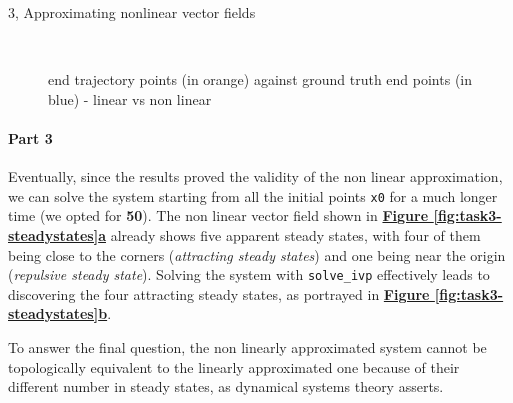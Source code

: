 \documentclass[10pt,a4paper]{article}
\begin{document}
\begin{task}{3, Approximating nonlinear vector fields}
\begin{figure}[ht!]
 \\
 \caption{end trajectory points (in orange) against ground truth end points (in blue) - linear vs non linear}%
 \label{fig:task3-linvsnonlin}%
\end{figure}

\paragraph{Part 3}
Eventually, since the results proved the validity of the non linear approximation, we can solve the system starting from all the initial points \texttt{x0} for a much longer time (we opted for \textbf{50}). The non linear vector field shown in \textbf{\hyperref[fig:task3-steadystates]{Figure \ref{fig:task3-steadystates}a}} already shows five apparent steady states, with four of them being close to the corners (\textit{attracting steady states}) and one being near the origin (\textit{repulsive steady state}). Solving the system with \texttt{solve\_ivp} effectively leads to discovering the four attracting steady states, as portrayed in \textbf{\hyperref[fig:task3-steadystates]{Figure \ref{fig:task3-steadystates}b}}. 

To answer the final question, the non linearly approximated system cannot be topologically equivalent to the linearly approximated one because of their different number in steady states, as dynamical systems theory asserts.


\begin{figure}[ht!]
 \centering
 

\end{figure}
\end{task}
\end{document}

